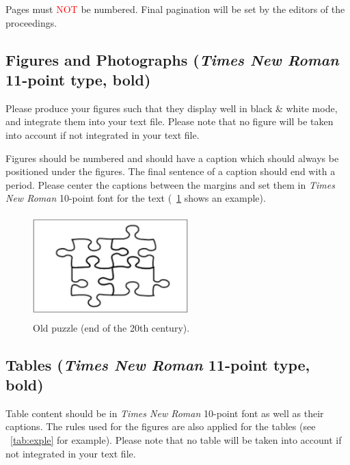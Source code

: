 \documentclass[highlight, final]{jobim2017}
\begin{document}
Pages must \textcolor{red}{NOT} be numbered. Final pagination will be set by
the editors of the proceedings.

\subsection{Figures and Photographs (\emph{Times New Roman} 11-point type, bold)}
\label{sec:figures-photographs}

Please produce your figures such that they display well in black \& white
mode, and integrate them into your text file. Please note that no figure will
be taken into account if not integrated in your text file.

Figures should be numbered and should have a
caption which should always be positioned under the figures. The final
sentence of a caption should end with a period. Please center the captions
between the margins and set them in
\emph{Times New Roman} 10-point font for the text (\figurename~\ref{fig:puzzle} shows an
example).

 \begin{figure}
   \begin{center}
     \setlength{\unitlength}{5mm}
     \includegraphics[height=4cm,width=6cm]{figs/fig1}
   \end{center}
   \caption{Old \jobim puzzle (end of the 20th century).}
   \label{fig:puzzle}
 \end{figure}

\subsection{Tables (\emph{Times New Roman} 11-point type, bold)}
\label{sec:tables}

Table content should be in \emph{Times New Roman} 10-point font as well as their
captions. The rules used for the figures are also applied for the tables
(see \tablename~\ref{tab:exple} for example). Please note that no table will be
taken into account if not integrated in your text file.
\end{document}
